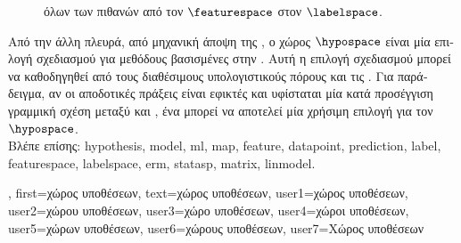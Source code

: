 {{\begin{figure}[H]
{{{			όλων των πιθανών}  \foreignlanguage{greek}{από τον}  $\featurespace$ \foreignlanguage{greek}{στον} 
			 $\labelspace$. \label{fig_hypospace_dict}} }
		\end{figure}
		\foreignlanguage{greek}{Από την άλλη πλευρά, από μηχανική άποψη της} , \foreignlanguage{greek}{ο χώρος}  
		$\hypospace$ \foreignlanguage{greek}{είναι μία επιλογή σχεδιασμού για μεθόδους βασισμένες στην} . \foreignlanguage{greek}{Αυτή 
		η επιλογή σχεδιασμού μπορεί να καθοδηγηθεί από τους διαθέσιμους υπολογιστικούς πόρους και τις} . \foreignlanguage{greek}{Για 
		παράδειγμα, αν οι αποδοτικές πράξεις}  \foreignlanguage{greek}{είναι εφικτές και υφίσταται μία κατά προσέγγιση 
		γραμμική σχέση μεταξύ}  \foreignlanguage{greek}{και} , \foreignlanguage{greek}{ένα}  
		\foreignlanguage{greek}{μπορεί να αποτελεί μία χρήσιμη επιλογή για τον} $\hypospace$.
				\\
		\foreignlanguage{greek}{Βλέπε επίσης:} \gls{hypothesis}, \gls{model}, \gls{ml}, \gls{map}, \gls{feature}, \gls{datapoint}, \gls{prediction}, \gls{label}, 
		\gls{featurespace}, \gls{labelspace}, \gls{erm}, \gls{statasp}, \gls{matrix}, \gls{linmodel}. },
	first={\foreignlanguage{greek}{χώρος υποθέσεων}},
	text={\foreignlanguage{greek}{χώρος υποθέσεων}}, 
	user1={\foreignlanguage{greek}{χώρος υποθέσεων}}, %
	user2={\foreignlanguage{greek}{χώρου υποθέσεων}}, %
	user3={\foreignlanguage{greek}{χώρο υποθέσεων}}, %
	user4={\foreignlanguage{greek}{χώροι υποθέσεων}}, %
	user5={\foreignlanguage{greek}{χώρων υποθέσεων}}, %
	user6={\foreignlanguage{greek}{χώρους υποθέσεων}}, %
	user7={\foreignlanguage{greek}{Χώρος υποθέσεων}} %
}

